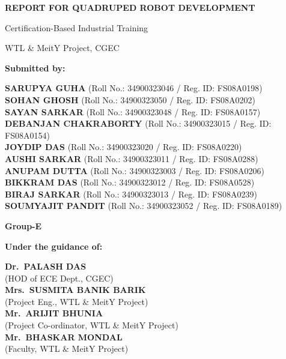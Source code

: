 \documentclass[12pt, a4paper]{article}
\begin{document}
\begin{center}

{\LARGE\bfseries\color{myred} REPORT FOR QUADRUPED ROBOT DEVELOPMENT\par}
\vspace{0.3cm}
{\small\color{myblue} Certification-Based Industrial Training\par}
{\small\color{myblue} WTL \& MeitY Project, CGEC\par}

\vspace{0.5cm}
{\normalsize\bfseries Submitted by:\par}
\vspace{0.3cm}

{\small\bfseries SARUPYA GUHA} {\small (Roll No.: 34900323046 / Reg. ID: FS08A0198)}\\[3pt]
{\small\bfseries SOHAN GHOSH} {\small (Roll No.: 34900323050 / Reg. ID: FS08A0202)}\\[3pt]
{\small\bfseries SAYAN SARKAR} {\small (Roll No.: 34900323048 / Reg. ID: FS08A0157)}\\[3pt]
{\small\bfseries DEBANJAN CHAKRABORTY} {\small (Roll No.: 34900323015 / Reg. ID: FS08A0154)}\\[3pt]
{\small\bfseries JOYDIP DAS} {\small (Roll No.: 34900323020 / Reg. ID: FS08A0220)}\\[3pt]
{\small\bfseries AUSHI SARKAR} {\small (Roll No.: 34900323011 / Reg. ID: FS08A0288)}\\[3pt]
{\small\bfseries ANUPAM DUTTA} {\small (Roll No.: 34900323003 / Reg. ID: FS08A0206)}\\[3pt]
{\small\bfseries BIKKRAM DAS} {\small (Roll No.: 34900323012 / Reg. ID: FS08A0528)}\\[3pt]
{\small\bfseries BIRAJ SARKAR} {\small (Roll No.: 34900323013 / Reg. ID: FS08A0239)}\\[3pt]
{\small\bfseries SOUMYAJIT PANDIT} {\small (Roll No.: 34900323052 / Reg. ID: FS08A0189)}\\[3pt]

\vspace{0.3cm}
{\normalsize\bfseries\color{myblue} Group-E\par}

\vspace{0.4cm}
{\normalsize\bfseries Under the guidance of:\par}
\vspace{0.2cm}

{\small\bfseries Dr.\ PALASH DAS}\\[-1pt]
{\small (HOD of ECE Dept., CGEC)}\\[3pt]
{\small\bfseries Mrs.\ SUSMITA BANIK BARIK}\\[-1pt]
{\small (Project Eng., WTL \& MeitY Project)}\\[3pt]
{\small\bfseries Mr.\ ARIJIT BHUNIA}\\[-1pt]
{\small (Project Co-ordinator, WTL \& MeitY Project)}\\[3pt]
{\small\bfseries Mr.\ BHASKAR MONDAL}\\[-1pt]
{\small (Faculty, WTL \& MeitY Project)}\\[5pt]


\end{center}
\end{document}
